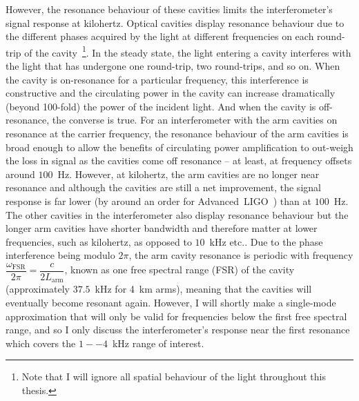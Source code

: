 However, the resonance behaviour of these cavities limits the interferometer's signal response at kilohertz. Optical cavities display resonance behaviour due to the different phases acquired by the light at different frequencies on each round-trip of the cavity~\footnote{Note that I will ignore all spatial behaviour of the light throughout this thesis.}. In the steady state, the light entering a cavity interferes with the light that has undergone one round-trip, two round-trips, and so on. When the cavity is on-resonance for a particular frequency, this interference is constructive and the circulating power in the cavity can increase dramatically (beyond 100-fold) the power of the incident light. And when the cavity is off-resonance, the converse is true. 
For an interferometer with the arm cavities on resonance at the carrier frequency, the resonance behaviour of the arm cavities is broad enough to allow the benefits of circulating power amplification to out-weigh the loss in signal as the cavities come off resonance -- at least, at frequency offsets around $100$~Hz. However, at kilohertz, the arm cavities are no longer near resonance and although the cavities are still a net improvement, the signal response is far lower (by around an order for Advanced~LIGO~\cite{}) than at $100$~Hz. The other cavities in the interferometer also display resonance behaviour but the longer arm cavities have shorter bandwidth and therefore matter at lower frequencies, such as kilohertz, as opposed to $10$~kHz etc.. 
Due to the phase interference being modulo $2\pi$, the arm cavity resonance is periodic with frequency $\dfrac{\omega_\text{FSR}}{2\pi}=\dfrac{c}{2L_\text{arm}}$, known as one free spectral range (FSR) of the cavity (approximately $37.5$~kHz for 4~km arms), meaning that the cavities will eventually become resonant again. However, I will shortly make a single-mode approximation that will only be valid for frequencies below the first free spectral range, and so I only discuss the interferometer's response near the first resonance which covers the $1--4$~kHz range of interest.

